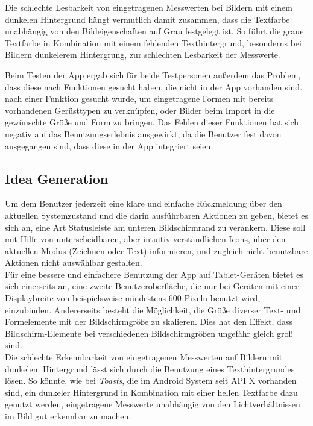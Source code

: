 Die schlechte Lesbarkeit von eingetragenen Messwerten bei Bildern mit einem dunkelen Hintergrund hängt vermutlich damit zusammen, dass die Textfarbe unabhängig von den Bildeigenschaften auf Grau festgelegt ist.
So führt die graue Textfarbe in Kombination mit einem fehlenden Texthintergrund, besonderns bei Bildern dunkelerem Hintergrung, zur schlechten Lesbarkeit der Messwerte. \\

Beim Testen der App ergab sich für beide Testpersonen außerdem das Problem, dass diese nach Funktionen gesucht haben, die nicht in der App vorhanden sind.
nach einer Funktion gesucht wurde, um eingetragene Formen mit bereits vorhandenen Gerüsttypen zu verknüpfen, oder Bilder beim Import in die gewünschte Größe und Form zu bringen.
Das Fehlen dieser Funktionen hat sich negativ auf das Benutzungserlebnis ausgewirkt, da die Benutzer fest davon ausgegangen sind, dass diese in der App integriert seien.

\subsection{Idea Generation}\label{subsec:idea2}
Um dem Benutzer jederzeit eine klare und einfache Rückmeldung über den aktuellen Systemzustand und die darin ausführbaren Aktionen zu geben, bietet es sich an, eine Art Statusleiste am unteren Bildschirmrand zu verankern.
Diese soll mit Hilfe von unterscheidbaren, aber intuitiv verständlichen Icons, über den aktuellen Modus (Zeichnen oder Text) informieren, und zugleich nicht benutzbare Aktionen nicht auswählbar gestalten. \\

Für eine bessere und einfachere Benutzung der App auf Tablet-Geräten bietet es sich einerseits an, eine zweite Benutzeroberfläche, die nur bei Geräten mit einer Displaybreite von beispielsweise mindestens $600$ Pixeln benutzt wird, einzubinden. 
Andererseits besteht die Möglichkeit, die Größe diverser Text- und Formelemente mit der Bildschirmgröße zu skalieren.
Dies hat den Effekt, dass Bildschirm-Elemente bei verschiedenen Bildschirmgrößen ungefähr gleich groß sind. \\

Die schlechte Erkennbarkeit von eingetragenen Messwerten auf Bildern mit dunkelem Hintergrund lässt sich durch die Benutzung eines Texthintergrundes lösen.
So könnte, wie bei \emph{Toasts}, die im Android System seit API X vorhanden sind, ein dunkeler Hintergrund in Kombination mit einer hellen Textfarbe dazu genutzt werden, eingetragene Messwerte unabhängig von den Lichtverhältnissen im Bild gut erkennbar zu machen. \\

